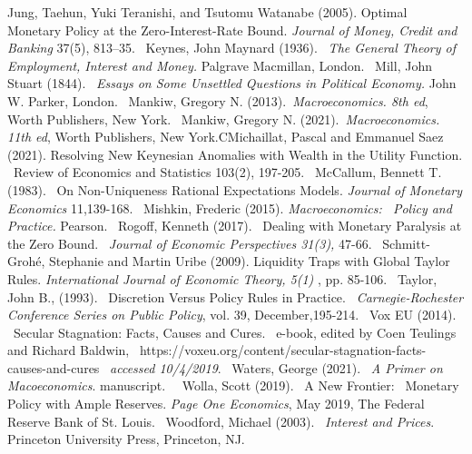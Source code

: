 \documentclass{article}
\begin{document}
\begin{doublespace}
Jung, Taehun, Yuki Teranishi, and Tsutomu Watanabe (2005). Optimal Monetary
Policy at the Zero-Interest-Rate Bound. \textit{Journal of Money, Credit and
Banking} 37(5), 813--35.\bigskip\ \newline
Keynes, John Maynard (1936). \ \textit{The General Theory of Employment,
Interest and Money.} Palgrave Macmillan, London.\bigskip\ \newline
Mill, John Stuart (1844). \ \textit{Essays on Some Unsettled Questions in
Political Economy.} John W. Parker, London.\bigskip\ \newline
Mankiw, Gregory N. (2013).\textit{\ Macroeconomics. 8th ed}, Worth
Publishers, New York.\bigskip\ \newline
Mankiw, Gregory N. (2021).\textit{\ Macroeconomics. 11th ed}, Worth
Publishers, New York.CMichaillat, Pascal and Emmanuel Saez (2021). Resolving
New Keynesian Anomalies with Wealth in the Utility Function. \ Review of
Economics and Statistics 103(2), 197-205.\bigskip\ \newline
McCallum, Bennett T. (1983). \ On Non-Uniqueness Rational Expectations
Models. \textit{Journal of Monetary Economics }11,139-168.\bigskip\ \newline
Mishkin, Frederic (2015). \textit{Macroeconomics: \ Policy and Practice.}
Pearson.\bigskip\ \newline
Rogoff, Kenneth (2017). \ Dealing with Monetary Paralysis at the Zero Bound.
\ \textit{Journal of Economic Perspectives 31(3), }47-66.\bigskip\ \newline
Schmitt-Groh\'{e}, Stephanie and Martin Uribe (2009). Liquidity Traps with
Global Taylor Rules. \textit{International Journal of Economic Theory, 5(1)}%
, pp. 85-106.\bigskip\ \newline
Taylor, John B., (1993). \ Discretion Versus Policy Rules in Practice. \ 
\textit{Carnegie-Rochester Conference Series on Public Policy}, vol. 39,
December,195-214.\bigskip\ \newline
Vox EU (2014). \ Secular Stagnation: Facts, Causes and Cures. \ e-book,
edited by Coen Teulings and Richard Baldwin, \
https://voxeu.org/content/secular-stagnation-facts-causes-and-cures \ 
\textit{accessed 10/4/2019}.\bigskip\ \newline
Waters, George (2021). \ \textit{A Primer on Macoeconomics}.
manuscript.\bigskip\ \ \newline
Wolla, Scott (2019). \ A New Frontier: \ Monetary Policy with Ample
Reserves. \textit{Page One Economics\registered }, May 2019, The Federal
Reserve Bank of St. Louis.\bigskip\ \newline
Woodford, Michael (2003). \ \textit{Interest and Prices}. Princeton
University Press, Princeton, NJ.


\end{doublespace}
\end{document}
